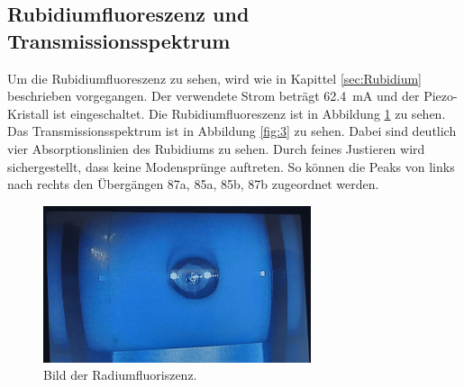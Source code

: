 \subsection{Rubidiumfluoreszenz und Transmissionsspektrum}

Um die Rubidiumfluoreszenz zu sehen, wird wie in Kapittel \ref{sec:Rubidium} beschrieben vorgegangen.
Der verwendete Strom beträgt \SI{62.4}{\milli\ampere} und der Piezo-Kristall ist eingeschaltet.
Die Rubidiumfluoreszenz ist in Abbildung \ref{fig:2} zu sehen.
Das Transmissionsspektrum ist in Abbildung \ref{fig:3} zu sehen.
Dabei sind deutlich vier Absorptionslinien des Rubidiums zu sehen. 
Durch feines Justieren wird sichergestellt, dass keine Modensprünge auftreten. 
So können die Peaks von links nach rechts den Übergängen 87a, 85a, 85b, 87b zugeordnet werden.

\begin{figure}
    \centering
    \includegraphics[width= 0.7\textwidth]{plots/Fluoreszenz_1.png}
    \caption{Bild der Radiumfluoriszenz.}
    \label{fig:2}
\end{figure}

